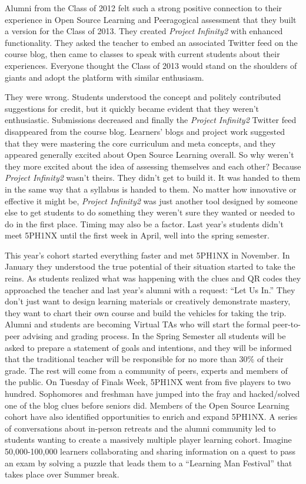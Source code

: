 Alumni from the Class of 2012 felt such a strong positive connection to
their experience in Open Source Learning and Peeragogical assessment
that they built a version for the Class of 2013. They created
\emph{Project Infinity2} with enhanced functionality. They asked the
teacher to embed an associated Twitter feed on the course blog, then
came to classes to speak with current students about their experiences.
Everyone thought the Class of 2013 would stand on the shoulders of
giants and adopt the platform with similar enthusiasm. 

They were wrong.  Students understood the concept and politely
contributed suggestions for credit, but it quickly became evident that
they weren't enthusiastic.  Submissions decreased and finally the
\emph{Project Infinity2} Twitter feed disappeared from the course
blog. Learners' blogs and project work suggested that they were
mastering the core curriculum and meta concepts, and they appeared
generally excited about Open Source Learning overall. So why weren't
they more excited about the idea of assessing themselves and each
other? Because \emph{Project Infinity2} wasn't theirs. They didn't get
to build it. It was handed to them in the same way that a syllabus is
handed to them. No matter how innovative or effective it might be,
\emph{Project Infinity2} was just another tool designed by someone
else to get students to do something they weren't sure they wanted or
needed to do in the first place. Timing may also be a factor. Last
year's students didn't meet 5PH1NX until the first week in April, well
into the spring semester. 

This year's cohort started everything faster and met 5PH1NX in
November. In January they understood the true potential of their
situation started to take the reins. As students realized what was
happening with the clues and QR codes they approached the teacher and
last year's alumni with a request: ``Let Us In.'' They don't just want
to design learning materials or creatively demonstrate mastery, they
want to chart their own course and build the vehicles for taking the
trip. Alumni and students are becoming Virtual TAs who will start the
formal peer-to-peer advising and grading process.  In the Spring
Semester all students will be asked to prepare a statement of goals
and intentions, and they will be informed that the traditional teacher
will be responsible for no more than 30\% of their grade. The rest
will come from a community of peers, experts and members of the
public. On Tuesday of Finals Week, 5PH1NX went from five players to
two hundred. Sophomores and freshman have jumped into the fray and
hacked/solved one of the blog clues before seniors did. Members of the
Open Source Learning cohort have also identified opportunities to
enrich and expand 5PH1NX. A series of conversations about in-person
retreats and the alumni community led to students wanting to create a
massively multiple player learning cohort. Imagine 50,000-100,000
learners collaborating and sharing information on a quest to pass an
exam by solving a puzzle that leads them to a ``Learning Man
Festival'' that takes place over Summer break.

